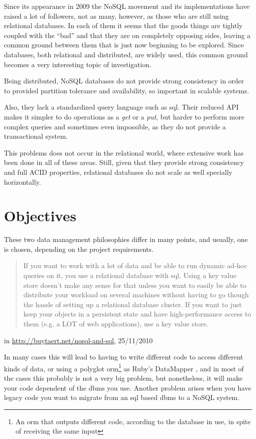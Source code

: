 Since its appearance in 2009 the NoSQL movement and its implementations have raised a lot of followers, not as many, however, as those who are still using relational databases. In each of them it seems that the goods things are tightly coupled with the ``bad'' and that they are on completely opposing sides, leaving a common ground between them that is just now beginning to be explored. Since databases, both relational and distributed, are widely used, this common ground becomes a very interesting topic of investigation.

Being distributed, NoSQL databases do not provide strong consistency in order to provided partition tolerance and availability, so important in scalable systems.

Also, they lack a standardized query language such as \ac{sql}. Their reduced API makes it simpler to do operations as a \emph{get} or a \emph{put}, but harder to perform more complex queries and sometimes even impossible, as they do not provide a transactional system. 

This problems does not occur in the relational world, where extensive work has been done in all of these areas. Still, given that they provide strong consistency and full ACID properties, relational databases do not scale as well specially horizontally.

\section{Objectives}

These two data management philosophies differ in many points, and usually, one is chosen, depending on the project requirements.
\begin{quote}
If you want to work with a lot of data and be able to run dynamic ad-hoc queries on it, you use a relational database with \ac{sql}. Using a key value store doesn't make any sense for that unless you want to easily be able to distribute your workload on several machines without having to go though the hassle of setting up a relational database cluster. If you want to just keep your objects in a persistent state and have high-performance access to them (e.g. a LOT of web applications), use a key value store.
\end{quote} 
\begin{flushright}in \url{http://buytaert.net/nosql-and-sql}, 25/11/2010\end{flushright}
	
In many cases this will lead to having to write different code to access different kinds of data, or using a polyglot \ac{orm}\footnote{An orm that outputs different code, according to the database in use, in spite of receiving the same input} as Ruby's DataMapper \cite{DM}, and in most of the cases this probably is not a very big problem, but nonetheless, it will make your code dependent of the \ac{dbms} you use. Another problem arises when you have legacy code you want to migrate from an \ac{sql} based \ac{dbms} to a NoSQL system. 	
 
